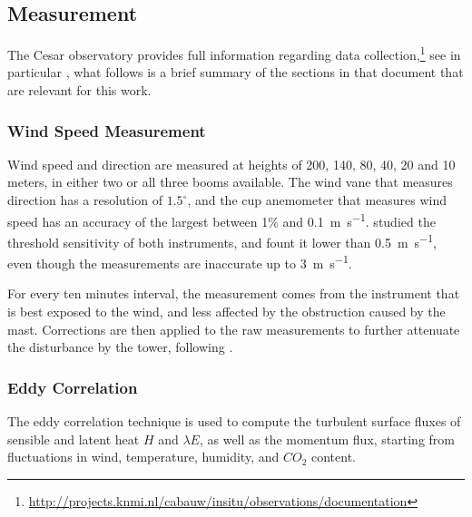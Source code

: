 \documentclass[a4paper,11pt]{kth-mag}
\begin{document}
\subsection{Measurement}
\label{sec:measurement}
The Cesar observatory provides full information regarding data collection,\footnote{\url{http://projects.knmi.nl/cabauw/insitu/observations/documentation}} see in particular \cite{cabauwinsitu}, what follows is a brief summary of the sections in that document that are relevant for this work.


\subsubsection{Wind Speed Measurement}
Wind speed and direction are measured at heights of 200, 140, 80, 40, 20 and 10 meters, in either two or all three booms available. The wind vane that measures direction has a resolution of $1.5^\circ$, and the cup anemometer that measures wind speed has an accuracy of the largest between 1\% and \SI{0.1}{\meter\per\second}. \cite{windinstr} studied the threshold sensitivity of both instruments, and fount it lower than \SI{0.5}{\meter\per\second}, even though the measurements are inaccurate up to \SI{3}{\meter\per\second}.

For every ten minutes interval, the measurement comes from the instrument that is best exposed to the wind, and less affected by the obstruction caused by the mast. Corrections are then applied to the raw measurements to further attenuate the disturbance by the tower, following \cite{winddistortion}.


\subsubsection{Eddy Correlation}
\label{sec:eddy_correlation}
The eddy correlation technique is used to compute the turbulent surface fluxes of sensible and latent heat $H$ and $\lambda E$, as well as the momentum flux, starting from fluctuations in wind, temperature, humidity, and $CO_2$ content.
\end{document}
